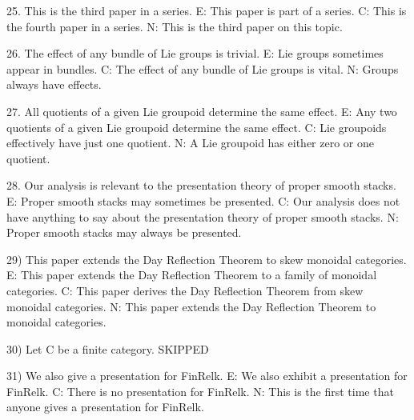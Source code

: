 25. This is the third paper in a series.
E: This paper is part of a series.
C: This is the fourth paper in a series.
N: This is the third paper on this topic.

26. The effect of any bundle of Lie groups is trivial.
E: Lie groups sometimes appear in bundles.
C: The effect of any bundle of Lie groups is vital.
N: Groups always have effects.

27.  All quotients of a given Lie groupoid determine the same effect.
E:  Any two quotients of a given Lie groupoid determine the same effect.
C: Lie groupoids effectively have just one quotient.
N: A Lie groupoid has either zero or one quotient.

28. Our analysis is relevant to the presentation theory of proper smooth stacks.
E: Proper smooth stacks may sometimes be presented.
C: Our analysis does not have anything to say about the presentation theory of proper smooth stacks.
N: Proper smooth stacks may always be presented.

29) This paper extends the Day Reflection Theorem to skew monoidal categories.
E:  This paper extends the Day Reflection Theorem to a family of monoidal categories.
C: This paper derives the Day Reflection Theorem from skew monoidal categories.
N: This paper extends the Day Reflection Theorem to monoidal categories.

30) Let C be a finite category.
SKIPPED

31) We also give a presentation for FinRelk.
E: We also exhibit a presentation for FinRelk.
C: There is no presentation for FinRelk.
N: This is the first time that anyone gives a presentation for FinRelk.

 

